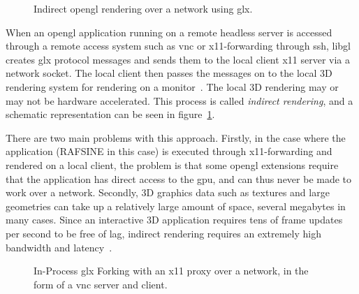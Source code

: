 \begin{figure}[!htb]
\centering 
\begin{normalsize}
\def\svgwidth{0.7\linewidth}

\end{normalsize}
\caption{Indirect \gls{opengl} rendering over a network using \gls{glx}.\protect\footnotemark}
\label{fig:virtualgl_indirect}
\end{figure}

When an \gls{opengl} application running on a remote headless server is accessed through a remote access system such as \gls{vnc} or \gls{x11}-forwarding through \gls{ssh}, \gls{libgl} creates \gls{glx} protocol messages and sends them to the local client \gls{x11} server via a network socket. The local client then passes the messages on to the local 3D rendering system for rendering on a monitor~\cite{libgl}. The local 3D rendering may or may not be hardware accelerated. This process is called \textit{indirect rendering}, and a schematic representation can be seen in figure~\ref{fig:virtualgl_indirect}.

There are two main problems with this approach. Firstly, in the case where the application (RAFSINE in this case) is executed through \gls{x11}-forwarding and rendered on a local client, the problem is that some \gls{opengl} extensions require that the application has direct access to the \gls{gpu}, and can thus never be made to work over a network. Secondly, 3D graphics data such as textures and large geometries can take up a relatively large amount of space, several megabytes in many cases. Since an interactive 3D application requires tens of frame updates per second to be free of lag, indirect rendering requires an extremely high bandwidth and latency~\cite{virtualgl}.

\begin{figure}[!htb]
\centering 
\begin{normalsize}
\def\svgwidth{0.9\linewidth}

\end{normalsize}
\caption{In-Process \gls{glx} Forking with an \gls{x11} proxy over a network, in the form of a \gls{vnc} server and client.\protect\footnotemark}
\label{fig:virtualgl_forking}
\end{figure}

